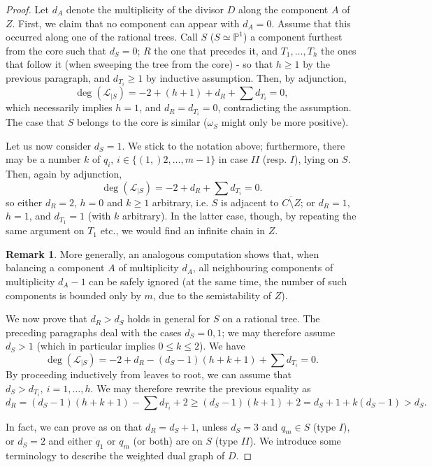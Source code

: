 \documentclass[11pt]{amsart}
\newcommand{\PP}{\mathbb P}
\theoremstyle{plain}
\theoremstyle{definition}
\newtheorem{rem}[thm]{Remark}
\begin{document}
\begin{proof}
Let $d_A$ denote the multiplicity of the divisor $D$ along the component $A$ of $Z$. First, we claim that no component can appear with $d_A=0$. Assume that this occurred along one of the rational trees. Call $S$ ($S\simeq\PP^1$) a component furthest from the core such that $d_S=0$; $R$ the one that precedes it, and $T_1,\ldots, T_h$ the ones that follow it (when sweeping the tree from the core) - so that $h\geq1$ by the previous paragraph, and $d_{T_i}\geq 1$ by inductive assumption. Then, by adjunction,
 \[\deg(\mathcal L_{|S})= -2+(h+1)+d_R+\sum d_{T_i}=0,\]
 which necessarily implies $h=1$, and $d_R=d_{T_i}=0$, contradicting the assumption. The case that $S$ belongs to the core is similar ($\omega_S$ might only be more positive).
 
Let us now consider $d_S=1$. We stick to the notation above; furthermore, there may be a number $k$ of $q_i$, $i\in\{(1,)2,\ldots,m-1\}$ in case $I\!I$ (resp. $I$), lying on $S$. Then, again by adjunction,
 \[\deg(\mathcal L_{|S})= -2+d_R+\sum d_{T_i}=0.\]
 so either $d_R=2$, $h=0$ and $k\geq 1$ arbitrary, i.e. $S$ is adjacent to $\overline{C\setminus Z}$; or $d_R=1$, $h=1$, and $d_{T_1}=1$ (with $k$ arbitrary). In the latter case, though, by repeating the same argument on $T_1$ etc., we would find an infinite chain in $Z$. 
 \begin{rem}\label{rmk:ignoring_1-trees}
  More generally, an analogous computation shows that, when balancing a component $A$ of multiplicity $d_A$, all neighbouring components of multiplicity $d_A-1$ can be safely ignored (at the same time, the number of such components is bounded only by $m$, due to the semistability of $Z$).
 \end{rem}

 We now prove that $d_R>d_S$ holds in general for $S$ on a rational tree. The preceding paragraphs deal with the cases $d_S=0,1$; we may therefore assume $d_S>1$ (which in particular implies $0\leq k\leq 2$). We have
 \[\deg(\mathcal L_{|S})= -2+d_R-(d_S-1)(h+k+1)+\sum d_{T_i}=0.\]
 By proceeding inductively from leaves to root, we can assume that $d_S>d_{T_i},\ i=1,\ldots,h$. We may therefore rewrite the previous equality as
 \[d_R=(d_S-1)(h+k+1)-\sum d_{T_i}+2\geq(d_S-1)(k+1)+2=d_S+1+k(d_S-1)>d_S.\]
 
In fact, we can prove as on \cite[p.893]{SMY1} that $d_R=d_S+1$, unless $d_S=3$ and $q_m\in S$ (type $I$), or $d_S=2$ and either $q_1$ or $q_m$ (or both) are on $S$ (type $I\!I$). We introduce some terminology to describe the weighted dual graph of $D$.


\end{proof}
\end{document}

